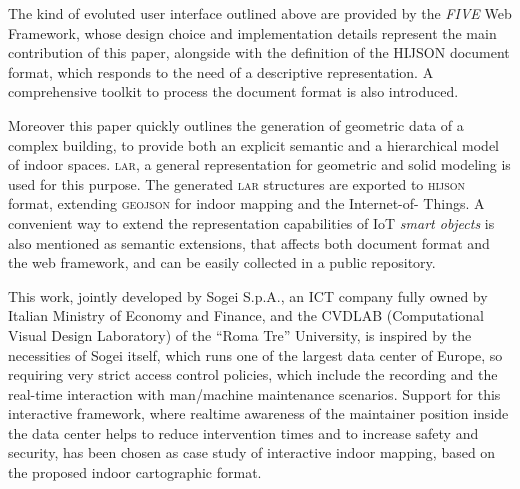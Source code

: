 The kind of evoluted user interface outlined above are provided by the
\emph{FIVE} Web Framework, whose design choice and implementation details
represent the main contribution of this paper, alongside with the definition
of the HIJSON document format, which responds to the need of a descriptive
representation. A comprehensive toolkit to process the document format is also
introduced.

Moreover this paper quickly outlines the generation of geometric data of a
complex building, to provide both an explicit semantic and a hierarchical
model of indoor spaces. \textsc{\large lar}, a general representation for
geometric and solid modeling is used for this purpose. The generated
\textsc{\large lar} structures are exported to \textsc{\large hijson} format,
extending \textsc{\large geojson} for indoor mapping and the Internet-of-
Things. A convenient way to extend the representation capabilities of IoT
\emph{smart objects} is also mentioned as semantic extensions, that affects
both document format and the web framework, and can be easily collected in a
public repository.


This work, jointly developed by Sogei S.p.A., an ICT company fully owned by
Italian  Ministry of Economy and Finance, and the CVDLAB (Computational Visual
Design Laboratory) of the ``Roma Tre'' University, is inspired by the
necessities of Sogei itself, which runs one of the largest data center of
Europe, so requiring very strict access control policies, which include the
recording and the real-time interaction with man/machine maintenance
scenarios. Support for this interactive framework, where realtime awareness of
the maintainer position inside the data center helps to reduce intervention
times and to increase safety and security, has been chosen as case study of
interactive indoor mapping, based on the proposed indoor cartographic format.




